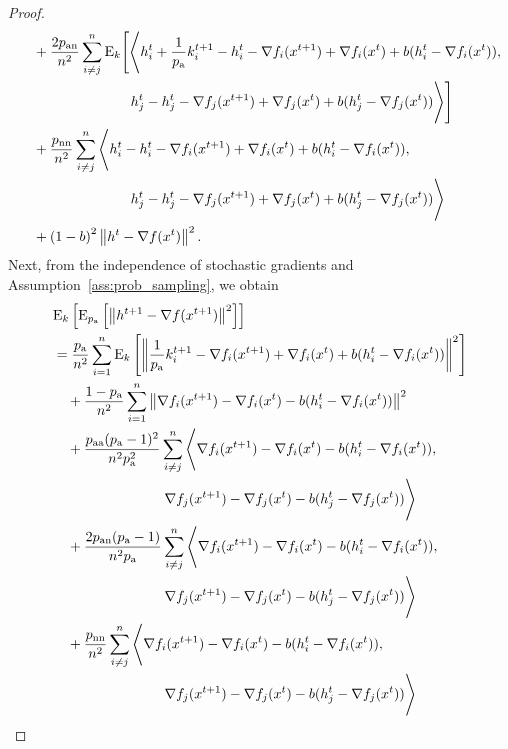 \documentclass{article}
\newcommand*{\probavailable}{\ensuremath{p_{\textnormal{a}}}}
\newcommand*{\probpairaa}{\ensuremath{p_{\textnormal{aa}}}}
\newcommand*{\probpairan}{\ensuremath{p_{\textnormal{an}}}}
\newcommand*{\probpairnn}{\ensuremath{p_{\textnormal{nn}}}}
\begin{document}
\begin{proof}
\begin{align*}
      &\quad +\frac{2\probpairan}{n^2}\sum_{i \neq j}^n{\rm E}_{k}\Bigg[\Bigg\langle h^{t}_i + \frac{1}{\probavailable}k^{t+1}_i - h^{t}_i - \nabla f_i(x^{t+1}) + \nabla f_i(x^{t}) + b(h^t_i - \nabla f_i(x^{t})),\\
      &\qquad\qquad\qquad\qquad h^{t}_j - h^{t}_j - \nabla f_j(x^{t+1}) + \nabla f_j(x^{t}) + b(h^t_j - \nabla f_j(x^{t}))\Bigg\rangle\Bigg] \\
      &\quad +\frac{\probpairnn}{n^2}\sum_{i \neq j}^n\Bigg\langle h^{t}_i - h^{t}_i - \nabla f_i(x^{t+1}) + \nabla f_i(x^{t}) + b(h^t_i - \nabla f_i(x^{t})), \\
      &\qquad\qquad\qquad\qquad h^{t}_j - h^{t}_j - \nabla f_j(x^{t+1}) + \nabla f_j(x^{t}) + b(h^t_j - \nabla f_j(x^{t}))\Bigg\rangle \\
      &\quad + \left(1 - b\right)^2 \norm{h^{t} - \nabla f(x^{t})}^2.
  \end{align*}
  Next, from the independence of stochastic gradients and Assumption~\ref{ass:prob_sampling}, we obtain
  \begin{align*}
    &\ExpSub{k}{\ExpSub{\probavailable}{\norm{h^{t+1} - \nabla f(x^{t+1})}^2}} \\
    &=\frac{\probavailable}{n^2}\sum_{i=1}^n \ExpSub{k}{\norm{\frac{1}{\probavailable}k^{t+1}_i - \nabla f_i(x^{t+1}) + \nabla f_i(x^{t}) + b(h^t_i - \nabla f_i(x^{t}))}^2} \\
    &\quad + \frac{1 - \probavailable}{n^2}\sum_{i=1}^n \norm{\nabla f_i(x^{t+1}) - \nabla f_i(x^{t}) - b(h^t_i - \nabla f_i(x^{t}))}^2 \\
    &\quad +\frac{\probpairaa(\probavailable - 1)^2}{n^2 \probavailable^2}\sum_{i \neq j}^n\Bigg\langle \nabla f_i(x^{t+1}) - \nabla f_i(x^{t}) - b(h^t_i - \nabla f_i(x^{t})), \\
    &\qquad\qquad\qquad\qquad \nabla f_j(x^{t+1}) - \nabla f_j(x^{t}) - b(h^t_j - \nabla f_j(x^{t}))\Bigg\rangle \\
    &\quad +\frac{2\probpairan (\probavailable - 1)}{n^2 \probavailable}\sum_{i \neq j}^n\Bigg\langle \nabla f_i(x^{t+1}) - \nabla f_i(x^{t}) - b(h^t_i - \nabla f_i(x^{t})),\\
    &\qquad\qquad\qquad\qquad \nabla f_j(x^{t+1}) - \nabla f_j(x^{t}) - b(h^t_j - \nabla f_j(x^{t}))\Bigg\rangle \\
    &\quad +\frac{\probpairnn}{n^2}\sum_{i \neq j}^n\Bigg\langle \nabla f_i(x^{t+1}) - \nabla f_i(x^{t}) - b(h^t_i - \nabla f_i(x^{t})), \\
    &\qquad\qquad\qquad\qquad \nabla f_j(x^{t+1}) - \nabla f_j(x^{t}) - b(h^t_j - \nabla f_j(x^{t}))\Bigg\rangle \\

\end{align*}
\end{proof}
\end{document}

